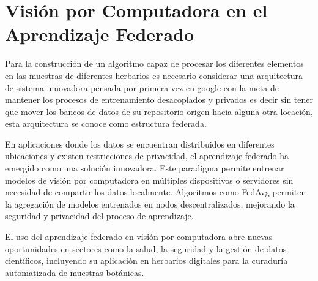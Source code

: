 \section{Visión por Computadora en el Aprendizaje Federado}

Para la construcción de un algoritmo capaz de procesar los diferentes elementos en las muestras de diferentes herbarios es necesario considerar una arquitectura de sistema innovadora pensada por primera vez en google con la meta de mantener los procesos de entrenamiento desacoplados y privados es decir sin tener que mover los bancos de datos de su repositorio origen hacia alguna otra locación, esta arquitectura se conoce como estructura federada.

En aplicaciones donde los datos se encuentran distribuidos en diferentes ubicaciones y existen restricciones de privacidad, el aprendizaje federado ha emergido como una solución innovadora. Este paradigma permite entrenar modelos de visión por computadora en múltiples dispositivos o servidores sin necesidad de compartir los datos localmente. Algoritmos como FedAvg permiten la agregación de modelos entrenados en nodos descentralizados, mejorando la seguridad y privacidad del proceso de aprendizaje.

El uso del aprendizaje federado en visión por computadora abre nuevas oportunidades en sectores como la salud, la seguridad y la gestión de datos científicos, incluyendo su aplicación en herbarios digitales para la curaduría automatizada de muestras botánicas.


